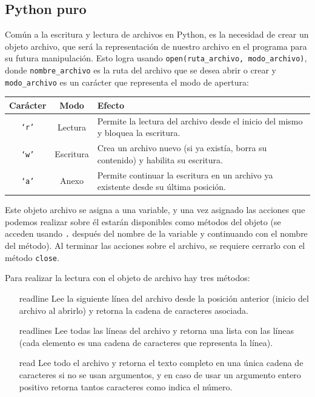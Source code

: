 \subsection{Python puro}

Común a la escritura y lectura de archivos en Python, es la necesidad de crear un objeto archivo, que será la representación de nuestro archivo en el programa
para su futura manipulación. Esto logra usando \texttt{open(ruta\_archivo, modo\_archivo)}, donde \texttt{nombre\_archivo} es la ruta del archivo que se desea
abrir o crear y \texttt{modo\_archivo} es un carácter que representa el modo de apertura:

\begin{tabular}{|c|c|p{8cm}|}
\hline
Carácter & Modo & Efecto \\
\hline
\texttt{`r'} & Lectura & Permite la lectura del archivo desde el inicio del mismo y bloquea la escritura. \\
\hline
\texttt{`w'} & Escritura & Crea un archivo nuevo (si ya existía, borra su contenido) y habilita su escritura. \\
\hline
\texttt{`a'} & Anexo & Permite continuar la escritura en un archivo ya existente desde su última posición. \\
\hline
\end{tabular}

Este objeto archivo se asigna a una variable, y una vez asignado las acciones que podemos realizar
sobre él estarán disponibles como métodos del objeto (se acceden usando \texttt{.} después del nombre de la variable
y continuando con el nombre del método). Al terminar las acciones sobre el archivo, se requiere cerrarlo con el método
\texttt{close}.

Para realizar la lectura con el objeto de archivo hay tres métodos:

\begin{itemize}
    \item[readline] Lee la siguiente línea del archivo desde la posición anterior (inicio del archivo al abrirlo)
    y retorna la cadena de caracteres asociada.
    \item[readlines] Lee todas las líneas del archivo y retorna una lista con las líneas (cada elemento es una cadena
    de caracteres que representa la línea).
    \item[read] Lee todo el archivo y retorna el texto completo en una única cadena de caracteres si no se usan argumentos,
    y en caso de usar un argumento entero positivo retorna tantos caracteres como indica el número.
\end{itemize}

